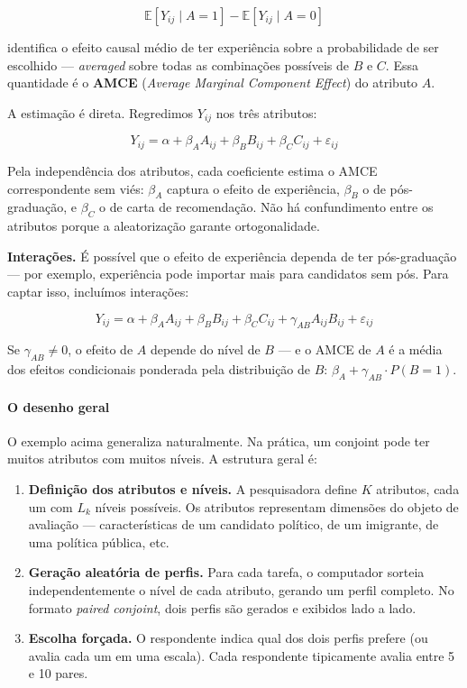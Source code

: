 \documentclass[
]{article}
\begin{document}
\[\mathbb{E}[Y_{ij} \mid A = 1] - \mathbb{E}[Y_{ij} \mid A = 0]\]

identifica o efeito causal médio de ter experiência sobre a probabilidade de ser escolhido --- \emph{averaged} sobre todas as combinações possíveis de \(B\) e \(C\). Essa quantidade é o \textbf{AMCE} (\emph{Average Marginal Component Effect}) do atributo \(A\).

A estimação é direta. Regredimos \(Y_{ij}\) nos três atributos:

\[Y_{ij} = \alpha + \beta_A A_{ij} + \beta_B B_{ij} + \beta_C C_{ij} + \varepsilon_{ij}\]

Pela independência dos atributos, cada coeficiente estima o AMCE correspondente sem viés: \(\beta_A\) captura o efeito de experiência, \(\beta_B\) o de pós-graduação, e \(\beta_C\) o de carta de recomendação. Não há confundimento entre os atributos porque a aleatorização garante ortogonalidade.

\textbf{Interações.} É possível que o efeito de experiência dependa de ter pós-graduação --- por exemplo, experiência pode importar mais para candidatos sem pós. Para captar isso, incluímos interações:

\[Y_{ij} = \alpha + \beta_A A_{ij} + \beta_B B_{ij} + \beta_C C_{ij} + \gamma_{AB} A_{ij} B_{ij} + \varepsilon_{ij}\]

Se \(\gamma_{AB} \neq 0\), o efeito de \(A\) depende do nível de \(B\) --- e o AMCE de \(A\) é a média dos efeitos condicionais ponderada pela distribuição de \(B\): \(\beta_A + \gamma_{AB} \cdot P(B=1)\).

\paragraph{O desenho geral}\label{o-desenho-geral}

O exemplo acima generaliza naturalmente. Na prática, um conjoint pode ter muitos atributos com muitos níveis. A estrutura geral é:

\begin{enumerate}
\def\labelenumi{\arabic{enumi}.}
\item
  \textbf{Definição dos atributos e níveis.} A pesquisadora define \(K\) atributos, cada um com \(L_k\) níveis possíveis. Os atributos representam dimensões do objeto de avaliação --- características de um candidato político, de um imigrante, de uma política pública, etc.
\item
  \textbf{Geração aleatória de perfis.} Para cada tarefa, o computador sorteia independentemente o nível de cada atributo, gerando um perfil completo. No formato \emph{paired conjoint}, dois perfis são gerados e exibidos lado a lado.
\item
  \textbf{Escolha forçada.} O respondente indica qual dos dois perfis prefere (ou avalia cada um em uma escala). Cada respondente tipicamente avalia entre 5 e 10 pares.
\end{enumerate}
\end{document}
